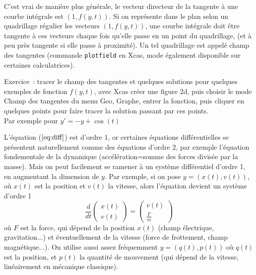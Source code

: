 \documentclass[a4paper,11pt]{article}
\begin{document}
\begin{giacjshere}
C'est vrai de mani\`ere plus g\'en\'erale, le vecteur directeur
de la tangente \`a une courbe int\'egrale est $(1,f(y,t))$. Si
on repr\'esente dans le plan selon un quadrillage r\'egulier
les vecteurs $(1,f(y,t))$, une courbe int\'egrale doit \^etre
tangente \`a ces vecteurs chaque fois qu'elle passe en un point
du quadrillage, (et \`a peu pr\`es tangente si elle passe \`a
proximit\'e). Un tel quadrillage est appel\'e champ des tangentes
(commande \verb|plotfield| en Xcas, mode \'egalement disponible
sur certaines calculatrices).

Exercice~: tracer le champ des tangentes et quelques solutions
pour quelques exemples de fonction $f(y,t)$, avec Xcas cr\'eer
une figure 2d, puis choisir le mode Champ des tangentes
du menu Geo, Graphe, entrer la fonction, puis cliquer en quelques
points pour faire tracer la solution passant par ces points.\\
Par exemple pour $y'=-y+\cos(t)$\\

L'\'equation (\(\ref{eq:diff}\)) est d'ordre 1, or certaines \'equations
diff\'erentielles se pr\'esentent naturellement comme des
\'equations d'ordre 2, par exemple l'\'equation fondementale
de la dynamique (acc\'el\'eration=somme des forces divis\'ee par
la masse). Mais on peut facilement se ramener \`a un
syst\`eme diff\'erentiel d'ordre
1, en augmentant la dimension de $y$. Par exemple, si
on pose $y=(x(t),v(t))$, o\`u $x(t)$ est la position
et $v(t)$ la vitesse, alors l'\'equation devient un syst\`eme d'ordre 1
$$ \frac{d}{dt} \left(\begin{array}{c} x(t) \\ v(t) \end{array}
\right) 
= \left(\begin{array}{c} v(t) \\ \frac{F}{m} \end{array} \right) $$
o\`u $F$ est la force, qui d\'epend de la position $x(t)$ 
(champ \'electrique, gravitation...) et
\'eventuellement de la vitesse (force de frottement, champ magn\'etique...).
On utilise aussi assez fr\'equemment $y=(q(t),p(t))$
o\`u $q(t)$ est la position, et $p(t)$ la quantit\'e de mouvement
(qui d\'epend de la vitesse, lin\'eairement en m\'ecanique classique).


\end{giacjshere}
\end{document}
